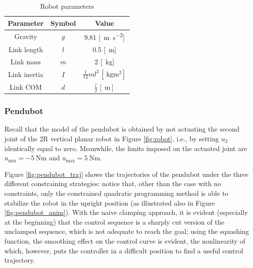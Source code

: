 \begin{table}[H]
    \centering
    \renewcommand{\arraystretch}{1.2}
    \setlength{\tabcolsep}{10pt}
    \begin{tabular}{ccc}
    \toprule
    \textbf{Parameter} & \textbf{Symbol} & \textbf{Value} \\ \midrule
    Gravity & $g$       & 9.81 [\SI{}{\meter\per\second\squared}] \\
    Link length & $l$       & 0.5 [\SI{}{\meter}] \\
    Link mass & $m$       & 2 [\SI{}{\kilogram}] \\
    Link inertia & $I$       & $\frac{1}{12} m l^2 \, [\SI{}{\kilogram\meter\squared}]$ \\
    Link COM & $d$       & $\frac{l}{2} \, [\SI{}{\meter}]$ \\
    \bottomrule
    \end{tabular}
    \caption{Robot parameters}
    \label{tab:parameters}
\end{table}

\subsubsection{Pendubot}
Recall that the model of the pendubot is obtained by not actuating the second joint of the 2R vertical planar robot in Figure \ref{fig:robot}, i.e., by setting $u_2$ identically equal to zero. Meanwhile, the limits imposed on the actuated joint are $u_{\text{min}} = -\SI{5}{\newton\meter}$ and $u_{\text{max}} = \SI{5}{\newton\meter}$.

Figure \ref{fig:pendubot_traj} shows the trajectories of the pendubot under the three different constraining strategies: notice that, other than the case with no constraints, only the constrained quadratic programming method is able to stabilize the robot in the upright position (as illustrated also in Figure \ref{fig:pendubot_anim}). With the naive clamping approach, it is evident (especially at the beginning) that the control sequence is a sharply cut version of the unclamped sequence, which is not adequate to reach the goal; using the squashing function, the smoothing effect on the control curve is evident, the nonlinearity of which, however, puts the controller in a difficult position to find a useful control trajectory.

